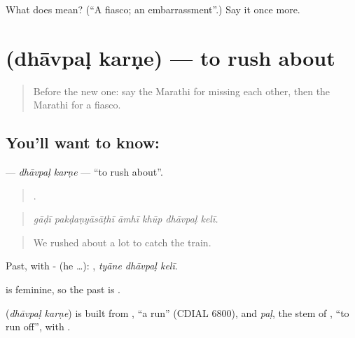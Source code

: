 \begin{tcolorbox}[breakable,colback=teal!4,colframe=teal!35!black,title={Before you move on}]
What does  mean? (\textquotedblleft{}A fiasco; an embarrassment\textquotedblright{}.) Say it once more.
\end{tcolorbox}
\section[\texorpdfstring{\mr{धावपळ} \mr{करणे} (dhāvpaḷ karṇe)}{धावपळ करणे (dhāvpaḷ karṇe)}]{  (dhāvpaḷ karṇe) — to rush about}

\label{lesson:MR-C434-dhavpal-karne}



\begin{quote}
Before the new one: say the Marathi for missing each other, then the Marathi for a fiasco.
\end{quote}

\subsection*{You'll want to know:  }
\textbf{ } — \emph{dhāvpaḷ karṇe} — \textquotedblleft{}to rush about\textquotedblright{}.

\begin{quote}
     .
\end{quote}

\begin{quote}
\emph{gāḍī pakḍaṇyāsāṭhī āmhī khūp dhāvpaḷ kelī.}
\end{quote}

\begin{quote}
We rushed about a lot to catch the train.
\end{quote}

Past, with - (he …):   , \emph{tyāne dhāvpaḷ kelī}.

 is feminine, so the past is  .

\begin{cousinweb}
\textbf{ } (\emph{dhāvpaḷ karṇe}) is built from \textbf{}, \textquotedblleft{}a run\textquotedblright{} (CDIAL 6800), and \emph{paḷ}, the stem of \textbf{}, \textquotedblleft{}to run off\textquotedblright{}, with \textbf{}.
\end{cousinweb}

